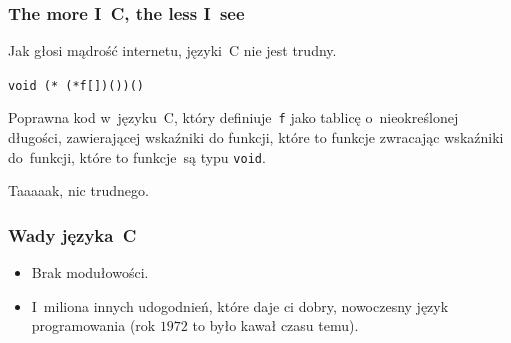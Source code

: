 \documentclass[10pt,t]{beamer}
\begin{document}
\begin{frame}
  \frametitle{The more I~C, the less I~see}


  Jak głosi mądrość internetu, języki~C nie jest trudny.

  \texttt{void (* (*f[])())()}

  Poprawna kod w~języku~C, który definiuje~\texttt{f} jako tablicę
  o~nieokreślonej długości, zawierającej wskaźniki do funkcji, które
  to funkcje zwracając wskaźniki do~funkcji, które to funkcje~są typu
  \texttt{void}.

  Taaaaak, nic trudnego.








\end{frame}





\begin{frame}
  \frametitle{Wady języka~C}


  \begin{itemize}




  \item Brak modułowości.

  \item I~miliona innych udogodnień, które daje ci dobry, nowoczesny język
    programowania (rok $1972$ to było kawał czasu temu).

  \end{itemize}

\end{frame}
\end{document}
